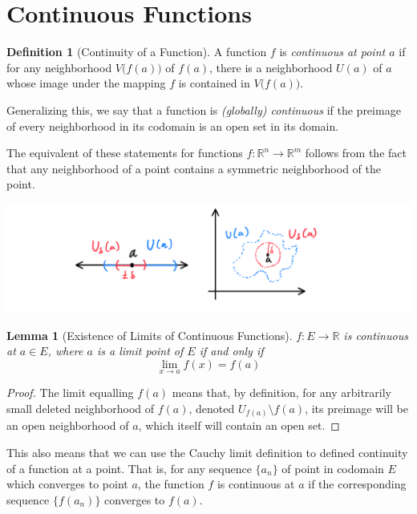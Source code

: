 \documentclass{article}
\newtheorem{lemma}[theorem]{Lemma}
\theoremstyle{remark}
\theoremstyle{definition}
\newtheorem{definition}{Definition}[section]
\begin{document}
\section{Continuous Functions}
\begin{definition}[Continuity of a Function]
A function $f$ is \textit{continuous at point $a$} if for any neighborhood $V\big(f(a)\big)$ of $f(a)$, there is a neighborhood $U(a)$ of $a$ whose image under the mapping $f$ is contained in $V\big( f(a)\big)$. 

Generalizing this, we say that a function is \textit{(globally) continuous} if the preimage of every neighborhood in its codomain is an open set in its domain. 
\end{definition}

The equivalent of these statements for functions $f: \mathbb{R}^n \longrightarrow \mathbb{R}^m$ follows from the fact that any neighborhood of a point contains a symmetric neighborhood of the point. 
\begin{center}
    \includegraphics[scale=0.35]{img/Symmetric_Neighborhood_in_Neighborhood.PNG}
\end{center}

\begin{lemma}[Existence of Limits of Continuous Functions]
$f: E \longrightarrow \mathbb{R}$ is continuous at $a \in E$, where $a$ is a limit point of $E$ if and only if 
\[\lim_{x \rightarrow a} f(x) = f(a)\]
\end{lemma}
\begin{proof}
The limit equalling $f(a)$ means that, by definition, for any arbitrarily small deleted neighborhood of $f(a)$, denoted $U_{f(a)} \setminus f(a)$, its preimage will be an open neighborhood of $a$, which itself will contain an open set. 
\end{proof}

This also means that we can use the Cauchy limit definition to defined continuity of a function at a point. That is, for any sequence $\{a_n\}$ of point in codomain $E$ which converges to point $a$, the function $f$ is continuous at $a$ if the corresponding sequence $\{f(a_n)\}$ converges to $f(a)$.
\end{document}
